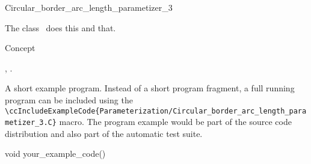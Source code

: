 

\begin{ccRefClass}{Circular_border_arc_length_parametizer_3}  %


\ccDefinition
  
The class \ccRefName\ does this and that.


\ccIsModel

Concept

\ccTypes


\ccCreation
{}  %


\ccOperations


\ccSeeAlso

,
.

\ccExample

A short example program.
Instead of a short program fragment, a full running program can be
included using the 
\verb|\ccIncludeExampleCode{Parameterization/Circular_border_arc_length_parametizer_3.C}| 
macro. The program example would be part of the source code distribution and
also part of the automatic test suite.

\begin{ccExampleCode}
void your_example_code() {
}
\end{ccExampleCode}


\end{ccRefClass}


